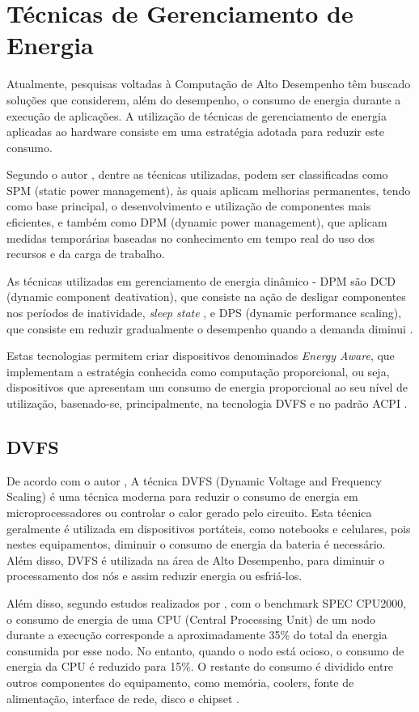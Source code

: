 \section{Técnicas de Gerenciamento de Energia}
Atualmente, pesquisas voltadas à Computação de Alto Desempenho têm buscado soluções que considerem, além do desempenho, o consumo de energia durante a execução de aplicações. A utilização de técnicas de gerenciamento de energia aplicadas ao hardware consiste em uma estratégia adotada para reduzir este consumo.

Segundo o autor \cite{beloglazov2011taxonomy}, dentre as técnicas utilizadas, podem ser classificadas como SPM (static power management), às quais aplicam melhorias permanentes, tendo como base principal, o desenvolvimento e utilização de componentes mais eficientes, e também como DPM (dynamic power management), que aplicam medidas temporárias baseadas no conhecimento em tempo real do uso dos recursos e da carga de trabalho.

 As técnicas utilizadas em gerenciamento de energia dinâmico - DPM são DCD (dynamic component deativation), que consiste na ação de desligar componentes nos períodos de inatividade, \textit{sleep state} , e DPS (dynamic performance scaling), que consiste em reduzir gradualmente o desempenho quando a demanda diminui \cite{beloglazov2011taxonomy}. 

Estas tecnologias permitem criar dispositivos denominados \textit{Energy Aware}, que implementam a estratégia conhecida como computação proporcional, ou seja, dispositivos que apresentam um consumo de energia proporcional ao seu nível de utilização, basenado-se, principalmente, na tecnologia DVFS e no padrão ACPI \cite{westphall2013principios}.

\subsection{DVFS}
De acordo com o autor \cite{rizvandi2012multiple}, A técnica DVFS (Dynamic Voltage and Frequency Scaling) é uma técnica moderna para reduzir o consumo de energia em microprocessadores ou controlar o calor gerado pelo circuito. Esta técnica geralmente é utilizada em dispositivos portáteis, como notebooks e celulares, pois nestes equipamentos, diminuir o consumo de energia da bateria é necessário. Além disso, DVFS é utilizada na área de Alto Desempenho, para diminuir o processamento dos nós e assim reduzir energia ou esfriá-los.

Além disso, segundo estudos realizados por \cite{feng2005power}, com o benchmark SPEC CPU2000, o consumo de energia de uma CPU (Central Processing Unit) de um nodo durante a execução corresponde a aproximadamente 35\% do total da energia consumida por esse nodo. No entanto, quando o nodo está ocioso, o consumo de energia da CPU é reduzido para 15\%. O restante do consumo é dividido entre outros componentes do equipamento, como memória, coolers, fonte de alimentação, interface de rede, disco e chipset \cite{lara2013resoluccao}.

